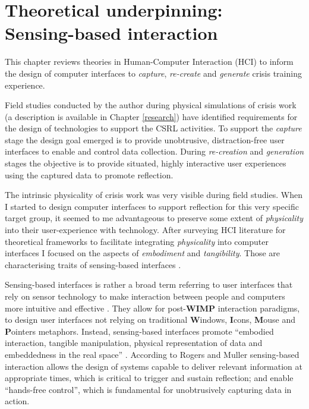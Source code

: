\chapter{Theoretical underpinning:\\Sensing-based interaction}\label{interaction}

This chapter reviews theories in Human-Computer Interaction (HCI) to inform the design of computer interfaces to \emph{capture}, \emph{re-create} and \emph{generate} crisis training experience.

Field studies conducted by the author during physical simulations of crisis work (a description is available in Chapter \ref{research}) have identified requirements for the design of technologies to support the CSRL activities. To support the \emph{capture} stage the design goal emerged is to provide unobtrusive, distraction-free user interfaces to enable and control data collection. During \emph{re-creation} and \emph{generation} stages the objective is to provide situated, highly interactive user experiences using the captured data to promote reflection.

The intrinsic physicality of crisis work was very visible during field studies. When I started to design computer interfaces to support reflection for this very specific target group, it seemed to me advantageous to preserve some extent of \emph{physicality} into their user-experience with technology. After surveying HCI literature for theoretical frameworks to facilitate integrating \emph{physicality} into computer interfaces I focused on the aspects of \emph{embodiment} and \emph{tangibility}. Those are characterising traits of sensing-based interfaces \autocite{Benford:2005bo}.

Sensing-based interfaces is rather a broad term referring to user interfaces that rely on sensor technology to make interaction between people and computers more intuitive and effective \autocite{Zhai:2005jm}. They allow for post-\textbf{WIMP} \autocite{VanDam:1997tz} interaction paradigms, to design user interfaces not relying on traditional \textbf{W}indows, \textbf{I}cons, \textbf{M}ouse and \textbf{P}ointers metaphors. Instead, sensing-based interfaces promote ``embodied interaction, tangible manipulation, physical representation of data and embeddedness in the real space'' \autocite{Hornecker:2006uq}. According to Rogers and Muller \autocite*{Rogers:2006te} sensing-based interaction allows the design of systems capable to deliver relevant information at appropriate times, which is critical to trigger and sustain reflection; and enable ``hands-free control'', which is fundamental for unobtrusively capturing data in action.

